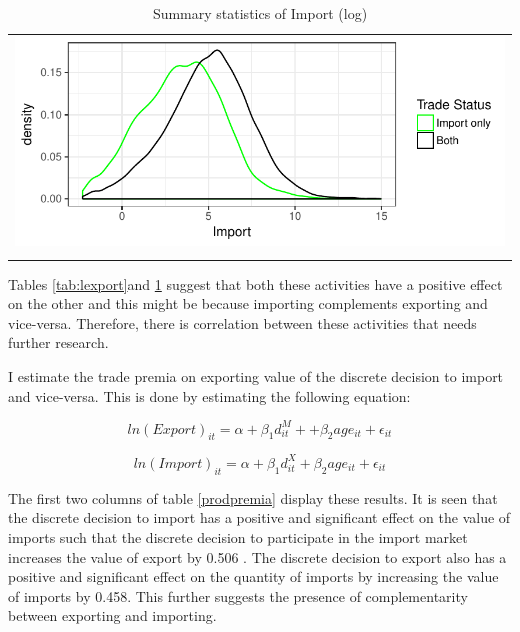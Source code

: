 \documentclass[11pt]{article}
\begin{document}
\begin{center}
\begin{table}[htp]
\caption{Summary statistics of Import (log)}
\label{tab:limport}
\begin{tabular}{c}
 \includegraphics{./PICS/denslimport.pdf}   \\ 
   \\  
\end{tabular}
\end{table}
\end{center}
Tables \ref{tab:lexport}and   \ref{tab:limport} suggest that both these activities have a
positive effect on the other and this might be because importing
complements exporting and vice-versa. Therefore, there is correlation between these
activities that needs further research. 

I estimate the trade premia on exporting value of the discrete
decision to import and vice-versa. This is done by estimating the
following equation:

$$  ln(Export)_{it} = \alpha +  \beta_{1} d_{it}^{M}+
+ \beta_{2} age_{it} + \epsilon_{it}$$

$$  ln(Import)_{it} = \alpha + \beta_{1} d_{it}^{X} + \beta_{2} age_{it} + \epsilon_{it}$$ 

\begin{center}

\end{center}

The first two columns of table \ref{prodpremia} display these
results. It is seen that the discrete decision to import has a positive and
significant effect on the value of imports such that the discrete
decision to participate in the import market increases the value of
export by 0.506 . The discrete decision to
export also has a positive and significant effect on the quantity of
imports by increasing the value of imports by 0.458.  This further suggests the presence of complementarity
between exporting and importing. 
\end{document}
